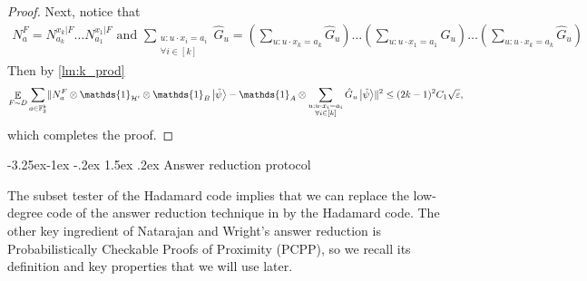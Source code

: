 \documentclass[11pt]{article}
\makeatletter
\renewcommand{\subsection}{\@startsection{subsection}{2}{\z@}%
             {-3.25ex\@plus -1ex \@minus -.2ex}%
             {1.5ex \@plus .2ex}%
             {\normalfont\large\scshape\bfseries}}
\theoremstyle{plain}
\theoremstyle{definition}
\DeclarePairedDelimiter{\norm}{\lVert}{\rVert}
\newcommand {\ket} [1] {\ensuremath{ \left| #1 \right\rangle }}
\DeclareMathOperator*{\bigE}{\mathbb{E}}
\newcommand {\id} {\ensuremath{\mathds{1}}}
\newcommand{\ep} {\ensuremath{\varepsilon}}
\newcommand{\x}{\otimes}
\newcommand{\calH}{\mathcal{H}}
\newcommand{\1}{\mathbb{1}} %
\newcommand{\bF}{\mathbb{F}}
\newcommand{\tpsi}{\tilde{\psi}}
\makeatother
\begin{document}
\begin{proof}
	 
Next, notice that 
\begin{align*}
	N^F_a = N^{x_k | F }_{a_k} \ldots N^{x_1 | F}_{a_1} \text{ and }  
	 \sum_{\substack{u: u\cdot x_i = a_i\\\forall i \in [k]}} \hat{G}_u = 
	 \left( \sum_{u: u\cdot x_k = a_k}\hat{G}_u \right)\ldots \left( \sum_{u: u\cdot x_1 = a_1}\hat{G}_u \right) \ldots \left( \sum_{u: u\cdot x_k = a_k}\hat{G}_u \right)
\end{align*}
Then by \cref{lm:k_prod}
\begin{align*}
	\bigE_{F \sim D} \sum_{a \in \bF_2^k} \norm{ N^F_a \x \id_{\calH'} \x \id_B \ket{\tpsi} - \id_A \x \sum_{\substack{u: u\cdot x_i = a_i\\\forall i \in [k]}} \hat{G}_u \ket{\tpsi}}^2 \leq  (2k-1)^2 C_1 \sqrt{\ep},
\end{align*}
which completes the proof.
\end{proof}

\subsection{Answer reduction protocol}

The subset tester of the Hadamard code implies that we can replace the low-degree code of the answer reduction technique
in \cite[Section 17.4]{neexp} by the Hadamard code. 
The other key ingredient of Natarajan and Wright's answer reduction is Probabilistically Checkable Proofs of Proximity (PCPP),
so we recall its definition and key properties that we will use later.
\end{document}
